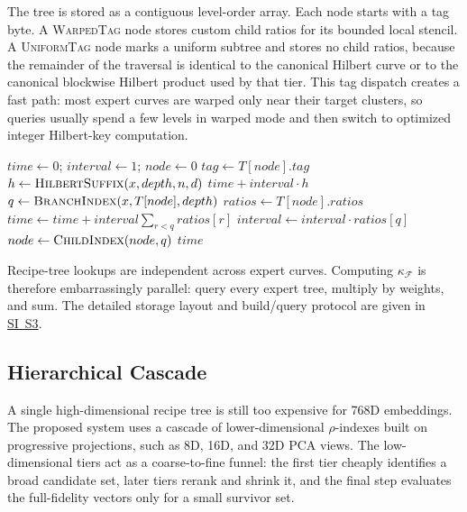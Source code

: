 \documentclass[11pt]{article}
\newcommand{\kappaf}{\kappa_{\mathcal F}}
\begin{document}
The tree is stored as a contiguous level-order array. Each node starts with a tag byte. A \textsc{WarpedTag} node stores custom child ratios for its bounded local stencil. A \textsc{UniformTag} node marks a uniform subtree and stores no child ratios, because the remainder of the traversal is identical to the canonical Hilbert curve or to the canonical blockwise Hilbert product used by that tier. This tag dispatch creates a fast path: most expert curves are warped only near their target clusters, so queries usually spend a few levels in warped mode and then switch to optimized integer Hilbert-key computation.

\begin{algorithm}[t]
\caption{\textsc{SFCInverse}: recipe-tree inverse lookup}
\label{alg:sfc-inverse}
\begin{algorithmic}[1]
    \State $time \gets 0$; $interval \gets 1$; $node \gets 0$
        \State $tag \gets T[node].tag$
            \State $h \gets \Call{HilbertSuffix}{x,depth,n,d}$
            \State \Return $time + interval \cdot h$
        \EndIf
        \State $q \gets \Call{BranchIndex}{x,T[node],depth}$
        \State $ratios \gets T[node].ratios$
        \State $time \gets time + interval\sum_{r<q} ratios[r]$
        \State $interval \gets interval \cdot ratios[q]$
        \State $node \gets \Call{ChildIndex}{node,q}$
    \EndFor
    \State \Return $time$
\EndProcedure
\end{algorithmic}
\end{algorithm}

Recipe-tree lookups are independent across expert curves. Computing $\kappaf$ is therefore embarrassingly parallel: query every expert tree, multiply by weights, and sum. The detailed storage layout and build/query protocol are given in \hyperref[sec:si-recipe-tree]{SI~S3}.

\subsection{Hierarchical Cascade}
A single high-dimensional recipe tree is still too expensive for 768D embeddings. The proposed system uses a cascade of lower-dimensional $\rho$-indexes built on progressive projections, such as 8D, 16D, and 32D PCA views. The low-dimensional tiers act as a coarse-to-fine funnel: the first tier cheaply identifies a broad candidate set, later tiers rerank and shrink it, and the final step evaluates the full-fidelity vectors only for a small survivor set.
\end{document}
